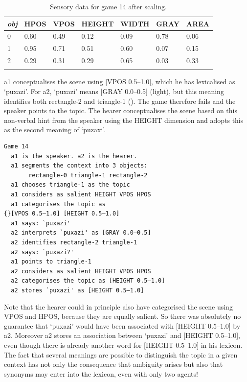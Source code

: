 \begin{table}
\begin{center}
\begin{tabular}{ l  l  l  l  l  l  l }
\lsptoprule
{\itshape obj} & HPOS & VPOS & HEIGHT & WIDTH & GRAY & AREA \\ \midrule
0 & 0.60 & 0.49 & 0.12 & 0.09 & 0.78 & 0.06\\ 
1 & 0.95 & 0.71 & 0.51 & 0.60 & 0.07 & 0.15\\ 
2 & 0.29 & 0.31 & 0.29 & 0.65 & 0.03 & 0.33\\ 
\lspbottomrule
\end{tabular}
\caption{\label{tab:game14}Sensory data for game 14 after scaling.}
\end{center}
\end{table}

{\bfshape  a1} conceptualises the scene using 
{}[VPOS 0.5–1.0], which he has lexicalised as `puxazi'. 
For {\bfshape  a2}, `puxazi' means [GRAY 0.0–0.5] (light), but this 
meaning identifies both rectangle-2 and
triangle-1 (). The game therefore
fails and the speaker points to the topic. The hearer
conceptualises the scene based on this non-verbal
hint from the speaker using the HEIGHT dimension and adopts this as the second meaning 
of `puzaxi'. 
\begin{verbatim}
Game 14
  a1 is the speaker. a2 is the hearer. 
  a1 segments the context into 3 objects: 
       rectangle-0 triangle-1 rectangle-2
  a1 chooses triangle-1 as the topic 
  a1 considers as salient HEIGHT VPOS HPOS 
  a1 categorises the topic as 
{}[VPOS 0.5–1.0] [HEIGHT 0.5–1.0]
  a1 says: `puxazi'
  a2 interprets `puxazi' as [GRAY 0.0–0.5]
  a2 identifies rectangle-2 triangle-1
  a2 says: `puxazi?'
  a1 points to triangle-1
  a2 considers as salient HEIGHT VPOS HPOS 
  a2 categorises the topic as [HEIGHT 0.5–1.0]
  a2 stores `puxazi' as [HEIGHT 0.5–1.0]
\end{verbatim}
Note that the hearer could in principle 
also have categorised the
scene using VPOS and HPOS, because they are
equally salient. So there was absolutely no 
guarantee that `puxazi' would have been associated 
with [HEIGHT 0.5–1.0] by {\bfshape  a2}. Moreover {\bfshape  a2} stores
an association between `puxazi' and [HEIGHT 0.5–1.0], even though 
there is already another word for 
{}[HEIGHT 0.5–1.0] in his lexicon. The fact that 
several meanings are possible to distinguish the topic in a given 
context has not only the consequence that ambiguity
arises but also that synonyms may enter into the lexicon, 
even with only two agents!


